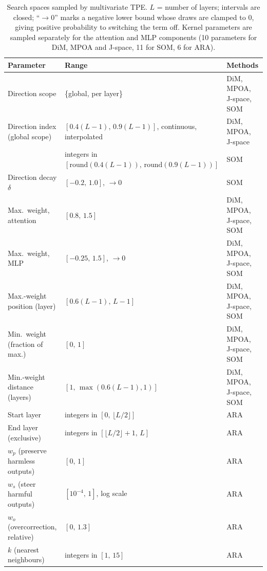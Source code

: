 \begin{table}[t]
\centering\small
\caption{Search spaces sampled by multivariate TPE. $L$ = number of layers;
intervals are closed; ``$\to0$'' marks a negative lower bound whose draws are
clamped to 0, giving positive probability to switching the term off. Kernel
parameters are sampled separately for the attention and MLP components (10
parameters for DiM, MPOA and J-space, 11 for SOM, 6 for ARA).}
\label{tab:search}
\begin{tabular}{lll}
\toprule
Parameter & Range & Methods \\
\midrule
Direction scope & \{global, per layer\} & DiM, MPOA, J-space, SOM \\
Direction index (global scope) & $[0.4(L-1),\,0.9(L-1)]$, continuous, interpolated & DiM, MPOA, J-space \\
                               & integers in $[\mathrm{round}(0.4(L-1)),\,\mathrm{round}(0.9(L-1))]$ & SOM \\
Direction decay $\delta$ & $[-0.2,\,1.0]$, $\to0$ & SOM \\
Max.\ weight, attention & $[0.8,\,1.5]$ & DiM, MPOA, J-space, SOM \\
Max.\ weight, MLP & $[-0.25,\,1.5]$, $\to0$ & DiM, MPOA, J-space, SOM \\
Max.-weight position (layer) & $[0.6(L-1),\,L-1]$ & DiM, MPOA, J-space, SOM \\
Min.\ weight (fraction of max.) & $[0,\,1]$ & DiM, MPOA, J-space, SOM \\
Min.-weight distance (layers) & $[1,\,\max(0.6(L-1),1)]$ & DiM, MPOA, J-space, SOM \\
\midrule
Start layer & integers in $[0,\,\lfloor L/2\rfloor]$ & ARA \\
End layer (exclusive) & integers in $[\lfloor L/2\rfloor+1,\,L]$ & ARA \\
$w_p$ (preserve harmless outputs) & $[0,\,1]$ & ARA \\
$w_s$ (steer harmful outputs) & $[10^{-4},\,1]$, log scale & ARA \\
$w_o$ (overcorrection, relative) & $[0,\,1.3]$ & ARA \\
$k$ (nearest neighbours) & integers in $[1,\,15]$ & ARA \\
\bottomrule
\end{tabular}
\end{table}

